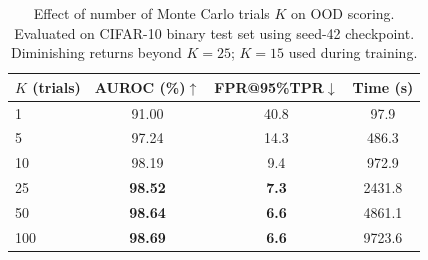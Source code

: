 \begin{table}[htbp]
    \centering
    \caption{Effect of number of Monte Carlo trials $K$ on OOD scoring.
             Evaluated on CIFAR-10 binary test set using seed-42 checkpoint.
             Diminishing returns beyond $K=25$; $K=15$ used during training.}
    \label{tab:k-ablation}
    \begin{tabular}{lccc}
        \toprule
        $K$ (trials) & AUROC (\%)$\uparrow$ & FPR@95\%TPR$\downarrow$ & Time (s) \\
        \midrule
        1 & 91.00 & 40.8 & 97.9 \\
        5 & 97.24 & 14.3 & 486.3 \\
        10 & 98.19 & 9.4 & 972.9 \\
        25 & \textbf{98.52} & \textbf{7.3} & 2431.8 \\
        50 & \textbf{98.64} & \textbf{6.6} & 4861.1 \\
        100 & \textbf{98.69} & \textbf{6.6} & 9723.6 \\
        \bottomrule
    \end{tabular}
\end{table}
